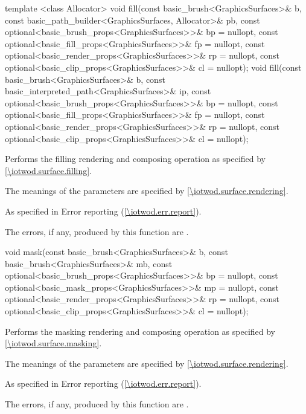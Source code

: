 %
\begin{itemdecl}
template <class Allocator>
void fill(const basic_brush<GraphicsSurfaces>& b,
  const basic_path_builder<GraphicsSurfaces, Allocator>& pb,
  const optional<basic_brush_props<GraphicsSurfaces>>& bp = nullopt,
  const optional<basic_fill_props<GraphicsSurfaces>>& fp = nullopt,
  const optional<basic_render_props<GraphicsSurfaces>>& rp = nullopt,
  const optional<basic_clip_props<GraphicsSurfaces>>& cl = nullopt);
void fill(const basic_brush<GraphicsSurfaces>& b,
  const basic_interpreted_path<GraphicsSurfaces>& ip,
  const optional<basic_brush_props<GraphicsSurfaces>>& bp = nullopt,
  const optional<basic_fill_props<GraphicsSurfaces>>& fp = nullopt,
  const optional<basic_render_props<GraphicsSurfaces>>& rp = nullopt,
  const optional<basic_clip_props<GraphicsSurfaces>>& cl = nullopt);
\end{itemdecl}
\begin{itemdescr}
\pnum
\effects
Performs the filling rendering and composing operation as specified by \ref{\iotwod.surface.filling}.

\pnum
The meanings of the parameters are specified by \ref{\iotwod.surface.rendering}.

\pnum
\throws
As specified in Error reporting (\ref{\iotwod.err.report}).

\pnum
\errors
The errors, if any, produced by this function are .
\end{itemdescr}

%
\begin{itemdecl}
void mask(const basic_brush<GraphicsSurfaces>& b,
  const basic_brush<GraphicsSurfaces>& mb,
  const optional<basic_brush_props<GraphicsSurfaces>>& bp = nullopt,
  const optional<basic_mask_props<GraphicsSurfaces>>& mp = nullopt,
  const optional<basic_render_props<GraphicsSurfaces>>& rp = nullopt,
  const optional<basic_clip_props<GraphicsSurfaces>>& cl = nullopt);
\end{itemdecl}
\begin{itemdescr}
\pnum
\effects
Performs the masking rendering and composing operation as specified by \ref{\iotwod.surface.masking}.

\pnum
The meanings of the parameters are specified by \ref{\iotwod.surface.rendering}.

\pnum
\throws
As specified in Error reporting (\ref{\iotwod.err.report}).

\pnum
\errors

The errors, if any, produced by this function are .
\end{itemdescr}

